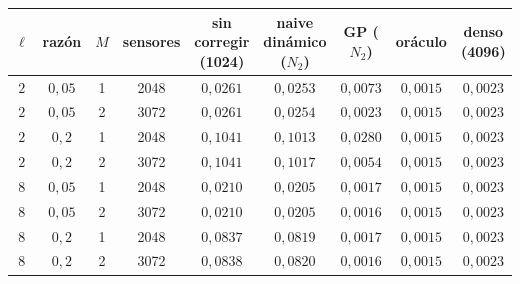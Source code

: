 \begin{tabular}{ccccccccc}
\toprule
$\ell$ & razón & $M$ & sensores & sin corregir (1024) & naive dinámico ($N_2$) & GP ($N_2$) & oráculo & denso (4096) \\
\midrule
$2$ & $0{,}05$ & 1 & 2048 & $0{,}0261$ & $0{,}0253$ & $0{,}0073$ & $0{,}0015$ & $0{,}0023$ \\
$2$ & $0{,}05$ & 2 & 3072 & $0{,}0261$ & $0{,}0254$ & $0{,}0023$ & $0{,}0015$ & $0{,}0023$ \\
\midrule
$2$ & $0{,}2$ & 1 & 2048 & $0{,}1041$ & $0{,}1013$ & $0{,}0280$ & $0{,}0015$ & $0{,}0023$ \\
$2$ & $0{,}2$ & 2 & 3072 & $0{,}1041$ & $0{,}1017$ & $0{,}0054$ & $0{,}0015$ & $0{,}0023$ \\
\midrule
$8$ & $0{,}05$ & 1 & 2048 & $0{,}0210$ & $0{,}0205$ & $0{,}0017$ & $0{,}0015$ & $0{,}0023$ \\
$8$ & $0{,}05$ & 2 & 3072 & $0{,}0210$ & $0{,}0205$ & $0{,}0016$ & $0{,}0015$ & $0{,}0023$ \\
\midrule
$8$ & $0{,}2$ & 1 & 2048 & $0{,}0837$ & $0{,}0819$ & $0{,}0017$ & $0{,}0015$ & $0{,}0023$ \\
$8$ & $0{,}2$ & 2 & 3072 & $0{,}0838$ & $0{,}0820$ & $0{,}0016$ & $0{,}0015$ & $0{,}0023$ \\
\bottomrule
\end{tabular}

